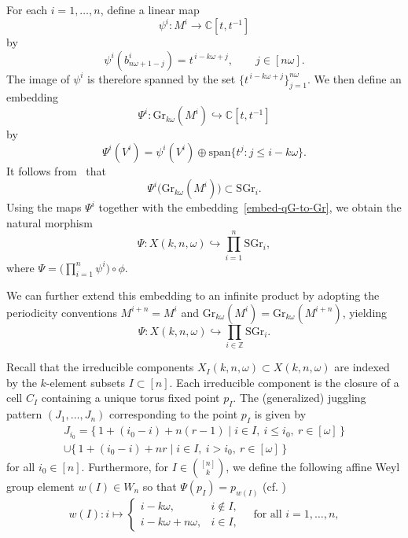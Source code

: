 \documentclass[10pt, a4paper, reqno]{amsart}
\begin{document}
For each \( i = 1, \ldots, n \), define a linear map 
\[
\psi^i: M^i \longrightarrow \mathbb{C}[t,t^{-1}]
\]
by
\begin{equation}
	\psi^i(b_{n\omega+1-j}^i) = t^{\,i - k\omega + j}, \qquad j \in [n\omega].
\end{equation}
The image of \( \psi^i \) is therefore spanned by the set \( \{t^{\,i - k\omega + j}\}_{j=1}^{n\omega} \).  
We then define an embedding
\begin{equation}
	\Psi^i: \mathrm{Gr}_{k\omega}(M^i) \hookrightarrow \mathbb{C}[t,t^{-1}]
\end{equation}
by
\begin{equation}
	\Psi^i(V^i) = \psi^i(V^i) \oplus \mathrm{span}\{t^j : j \leq i - k\omega\}.
\end{equation}
It follows from~\cite[Lemma~6.2]{flp24} that 
\[
\Psi^i\big(\mathrm{Gr}_{k\omega}(M^i)\big) \subset \mathrm{SGr}_i.
\]
Using the maps \( \Psi^i \) together with the embedding~\eqref{embed-qG-to-Gr}, we obtain the natural morphism
\begin{equation}
	\Psi: X(k,n,\omega)\hookrightarrow \prod_{i=1}^n \mathrm{SGr}_i,
\end{equation}
where \( \Psi = \big(\prod_{i=1}^n \psi^i\big) \circ \phi \).

We can further extend this embedding to an infinite product by adopting the periodicity conventions 
\( M^{i+n} = M^i \) and \( \mathrm{Gr}_{k\omega}(M^i) = \mathrm{Gr}_{k\omega}(M^{i+n}) \), yielding
\begin{equation}\label{embedpsi}
	\Psi: X(k,n,\omega) \hookrightarrow \prod_{i\in\mathbb{Z}} \mathrm{SGr}_i.
\end{equation}



Recall that the irreducible components 
$X_I(k,n,\omega) \subset X(k,n,\omega)$ 
are indexed by the $k$-element subsets $I \subset [n]$.  
Each irreducible component is the closure of a cell $C_I$ 
containing a unique torus fixed point $p_I$.  
The (generalized) juggling pattern $(J_1, \ldots, J_n)$ 
corresponding to the point $p_I$ is given by
\begin{align*}
J_{i_0}
= \big\{\,1 + (i_0 - i) + n(r - 1) \mid i \in I,~ i \le i_0,~ r \in [\omega]\,\big\}\\
\cup 
\big\{\,1 + (i_0 - i) + nr \mid i \in I,~ i > i_0,~ r \in [\omega]\,\big\}
\end{align*}
for all $i_0 \in [n]$. Furthermore, for $I \in \binom{[n]}{k}$, 
we define the following affine Weyl group element $w(I) \in W_n$ so that $\Psi(p_I) = p_{w(I)}$ (cf. \cite[Corollary 6.8]{flp24})
\[
w(I) : i \mapsto 
\begin{cases}
	i - k\omega, & i \notin I,\\[4pt]
	i - k\omega + n\omega, & i \in I,
\end{cases}
\quad \text{for all } i = 1, \ldots, n,
\]
\end{document}
